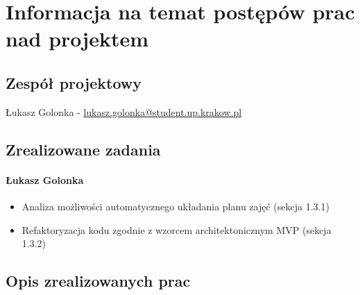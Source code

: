 \documentclass[12pt,a4paper,oneside]{article}
\theoremstyle{definition}
\numberwithin{equation}{section}
\begin{document}
\tableofcontents


\newpage

\section{Informacja na temat postępów prac nad projektem}
\subsection{Zespół projektowy}
Łukasz Golonka - \href{mailto:lukasz.golonka@student.up.krakow.pl}{lukasz.golonka@student.up.krakow.pl}
\subsection{Zrealizowane zadania}
\paragraph{Łukasz Golonka}
\begin{itemize}
	\item Analiza możliwości automatycznego układania planu zajęć (sekcja 1.3.1)
	\item Refaktoryzacja kodu zgodnie z wzorcem architektonicznym MVP (sekcja 1.3.2)
\end{itemize}


\subsection {Opis zrealizowanych prac}
\end{document}

